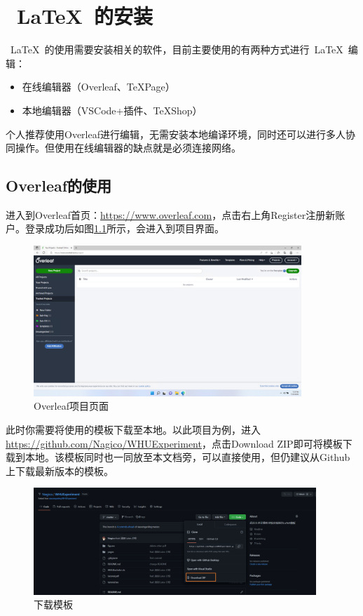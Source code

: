 \chapter{~\LaTeX~的安装}

~\LaTeX~的使用需要安装相关的软件，目前主要使用的有两种方式进行~\LaTeX~编辑：
\begin{itemize}
  \item 在线编辑器（Overleaf、TeXPage）
  \item 本地编辑器（VSCode+插件、TeXShop）
\end{itemize}

个人推荐使用Overleaf进行编辑，无需安装本地编译环境，同时还可以进行多人协同操作。但使用在线编辑器的缺点就是必须连接网络。

\section{Overleaf的使用}

进入到Overleaf首页：\url{https://www.overleaf.com}，点击右上角Register注册新账户。登录成功后如图\ref{fig:2-overlead-home}所示，会进入到项目界面。

\begin{figure}[htb]
  \centering
  \includegraphics[width=0.9\textwidth]{figures/chapter2/overleaf-home.png}
  \caption{Overleaf项目页面}
  \label{fig:2-overlead-home}
\end{figure}

此时你需要将使用的模板下载至本地。以此项目为例，进入\url{https://github.com/Nagico/WHUExperiment}，点击Download ZIP即可将模板下载到本地。该模板同时也一同放至本文档旁，可以直接使用，但仍建议从Github上下载最新版本的模板。

\begin{figure}[htb]
    \centering
    \includegraphics[width=0.95\textwidth]{figures/chapter2/download-repo.png}
    \caption{下载模板}
    \label{fig:2-github-download}
\end{figure}

